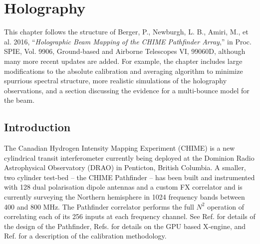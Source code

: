 \chapter{\label{chap:hol} Holography}
 



This chapter follows the structure of 
\newline
\newline
Berger, P., Newburgh, L. B., Amiri, M., et al. 2016, ``\textit{Holographic Beam Mapping of the CHIME Pathfinder Array},'' in Proc. SPIE, Vol. 9906, Ground-based and Airborne Telescopes VI, 99060D,
\newline
\newline
although many more recent updates are added. For example, the chapter includes large modifications to the absolute calibration and averaging algorithm to minimize spurrious spectral structure, more realistic simulations of the holography observations, and a section discussing the evidence for a multi-bounce model for the beam.

\newpage

\section{Introduction} \label{ch:hol:sec:intro}

The Canadian Hydrogen Intensity Mapping Experiment (CHIME) is a new cylindrical transit interferometer currently being deployed at the Dominion Radio Astrophysical Observatory (DRAO) in Penticton, British Columbia. A smaller, two cylinder test-bed -- the CHIME Pathfinder -- has been built and instrumented with 128 dual polarisation dipole antennas and a custom FX correlator and is currently surveying the Northern hemisphere in 1024 frequency bands between 400 and 800 MHz. The Pathfinder correlator performs the full $N^2$ operation of correlating each of its 256 inputs at each frequency channel. See Ref. \citep{chimepath1} for details of the design of the Pathfinder, Refs. \citep{xeng1, xeng2, xeng3} for details on the GPU based X-engine, and Ref. \citep{chimepath2} for a description of the calibration methodology.

